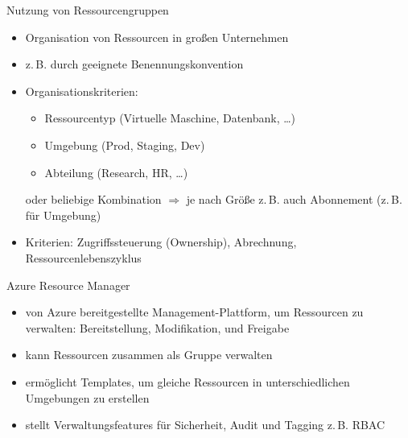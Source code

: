 \begin{flashcard}[\ ]{Nutzung von Ressourcengruppen}
    \begin{itemize}
        \item Organisation von Ressourcen in großen Unternehmen
        \item z.\,B. durch geeignete Benennungskonvention
        \item Organisationskriterien:
            \begin{itemize}
                \item Ressourcentyp (Virtuelle Maschine, Datenbank, \ldots)
                \item Umgebung (Prod, Staging, Dev)
                \item Abteilung (Research, HR, \ldots)
            \end{itemize}
            oder beliebige Kombination\newline
            $\Rightarrow$ je nach Größe z.\,B. auch Abonnement (z.\,B. für Umgebung)
        \item Kriterien: Zugriffssteuerung (Ownership), Abrechnung, Ressourcenlebenszyklus
    \end{itemize}

\end{flashcard}

\begin{flashcard}[Definition]{Azure Resource Manager}
    \begin{itemize}
        \item von Azure bereitgestellte Management-Plattform, um Ressourcen zu verwalten:\newline
        Bereitstellung, Modifikation, und Freigabe
        \item kann Ressourcen zusammen als Gruppe verwalten
        \item ermöglicht Templates, um gleiche Ressourcen in unterschiedlichen Umgebungen zu erstellen
        \item stellt Verwaltungsfeatures für Sicherheit, Audit und Tagging\newline
        z.\,B. RBAC
    \end{itemize}

\end{flashcard}

